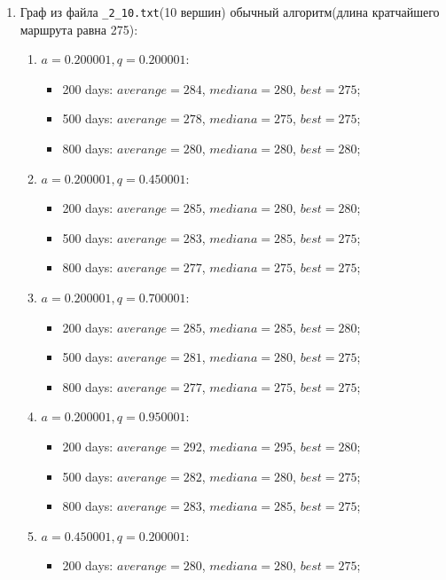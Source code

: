 \begin{enumerate}
\begin{enumerate}
\begin{itemize}
		\end{itemize}
	\end{enumerate}
	\item Граф из файла \texttt{\_2\_10.txt}(10 вершин) обычный алгоритм(длина кратчайшего маршрута равна 275):
	\begin{enumerate}
		\item $a= 0.200001, q= 0.200001$:
		\begin{itemize}
			\item 200 days: $averange = 284$, $mediana = 280$, $best = 275$;
			\item 500 days: $averange = 278$, $mediana = 275$, $best = 275$;
			\item 800 days: $averange = 280$, $mediana = 280$, $best = 280$;
		\end{itemize}
		\item $a= 0.200001, q= 0.450001$:
		\begin{itemize}
			\item 200 days: $averange = 285$, $mediana = 280$, $best = 280$;
			\item 500 days: $averange = 283$, $mediana = 285$, $best = 275$;
			\item 800 days: $averange = 277$, $mediana = 275$, $best = 275$;
		\end{itemize}
		\item $a= 0.200001, q= 0.700001$:
		\begin{itemize}
			\item 200 days: $averange = 285$, $mediana = 285$, $best = 280$;
			\item 500 days: $averange = 281$, $mediana = 280$, $best = 275$;
			\item 800 days: $averange = 277$, $mediana = 275$, $best = 275$;
		\end{itemize}
		\item $a= 0.200001, q= 0.950001$:
		\begin{itemize}
			\item 200 days: $averange = 292$, $mediana = 295$, $best = 280$;
			\item 500 days: $averange = 282$, $mediana = 280$, $best = 275$;
			\item 800 days: $averange = 283$, $mediana = 285$, $best = 275$;
		\end{itemize}
		\item $a= 0.450001, q= 0.200001$:
		\begin{itemize}
			\item 200 days: $averange = 280$, $mediana = 280$, $best = 275$;

\end{itemize}
\end{enumerate}
\end{enumerate}

